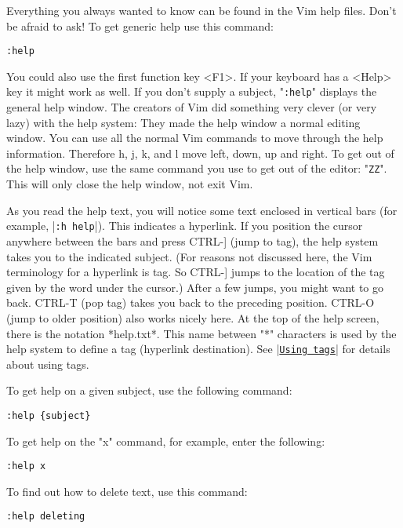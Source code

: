 Everything you always wanted to know can be found in the Vim help files.
Don't be afraid to ask!
To get generic help use this command:

 \begin{Verbatim}[samepage=true]
 :help
 \end{Verbatim}

You could also use the first function key <F1>.
If your keyboard has a <Help> key it might work as well.
If you don't supply a subject, "\texttt{:help}" displays the general help window.
The creators of Vim did something very clever (or very lazy) with the help system: They made the help window a normal editing window.
You can use all the normal Vim commands to move through the help information.
Therefore h, j, k, and l move left, down, up and right.
To get out of the help window, use the same command you use to get out of the editor: "\texttt{ZZ}".
This will only close the help window, not exit Vim.

As you read the help text, you will notice some text enclosed in vertical bars (for example, |\texttt{:h help}|).
This indicates a hyperlink.
If you position the cursor anywhere between the bars and press CTRL-] (jump to tag), the help system takes you to the indicated subject.
(For reasons not discussed here, the Vim terminology for a hyperlink is tag.
So CTRL-] jumps to the location of the tag given by the word under the cursor.) After a few jumps, you might want to go back.
CTRL-T (pop tag) takes you back to the preceding position.
CTRL-O (jump to older position) also works nicely here.
At the top of the help screen, there is the notation *help.txt*.
This name between "*" characters is used by the help system to define a tag (hyperlink destination).
See |\hyperref[Using tags]{\texttt{Using tags}}| for details about using tags.

To get help on a given subject, use the following command:

 \begin{Verbatim}[samepage=true]
 :help {subject}
 \end{Verbatim}

To get help on the "x" command, for example, enter the following:

 \begin{Verbatim}[samepage=true]
 :help x
 \end{Verbatim}

To find out how to delete text, use this command:

 \begin{Verbatim}[samepage=true]
 :help deleting
 \end{Verbatim}

